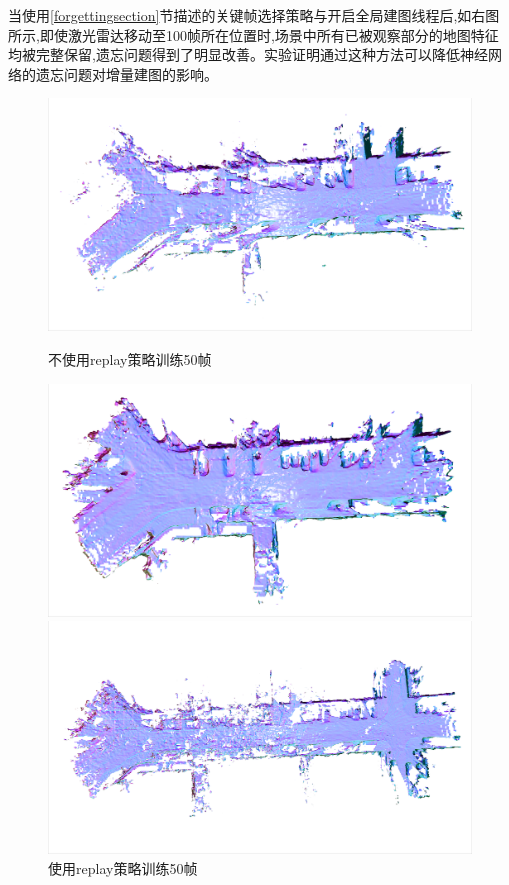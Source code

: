当使用\ref{forgettingsection}节描述的关键帧选择策略与开启全局建图线程后,如右图所示,即使激光雷达移动至100帧所在位置时,场景中所有已被观察部分的地图特征均被完整保留,遗忘问题得到了明显改善。实验证明通过这种方法可以降低神经网络的遗忘问题对增量建图的影响。
\begin{figure}[htbp]
	\centering
	\begin{minipage}{0.5\linewidth}
		\centering
		\includegraphics[width=1\linewidth]{figures/50w.png}
        \caption*{不使用replay策略训练50帧}
	\end{minipage}\hfill
	\begin{minipage}{0.5\linewidth}
		\centering
		\includegraphics[width=1\linewidth]{figures/50o.png}
        \caption*{使用replay策略训练50帧}
	\end{minipage}
    \vfill
	\begin{minipage}{0.5\linewidth}
		\centering
		\includegraphics[width=1\linewidth]{figures/100w.png}

\end{minipage}
\end{figure}
